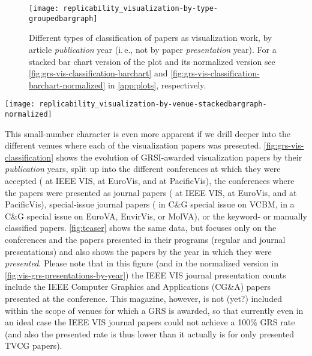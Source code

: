 \documentclass[conference,svgnames]{vgtc}                     %
\newcommand{\ie}{i.\,e.}
\begin{document}
\begin{figure}
	\centering
	\texttt{[image: replicability\_visualization-by-type-groupedbargraph]}
	\caption{Different types of classification of papers as visualization work, by article \emph{publication} year (\ie, not by paper \emph{presentation} year). For a stacked bar chart version of the plot and its normalized version see \autoref{fig:grs-vis-classification-barchart} and \autoref{fig:grs-vis-classification-barchart-normalized} in \autoref{app:plots}, respectively.}
	\label{fig:grs-vis-classification}
\end{figure}

\begin{figure*}
	\centering
	\texttt{[image: replicability\_visualization-by-venue-stackedbargraph-normalized]}
	\caption{Papers that can clearly be classified as visualization work (based on being accepted to visualization conferences, being journal presentations at visualization conferences,\textsuperscript{\ref{foot:vis_presentations},\ref{foot:c-and-g-special}} or having appeared in visualization-themed special issues in journals) by \emph{presentation} year (\ie, based on the \emph{conference years}, in which the papers were presented; same data as in \autoref{fig:teaser}), with their GRS proportions, normalized.}
	\label{fig:vis-grs-presentations-by-year}
\end{figure*}

This small-number character is even more apparent if we drill deeper into the different venues where each of the visualization papers was presented. \autoref{fig:grs-vis-classification} shows the evolution of GRSI-awarded visualization papers by their \emph{publication} years, split up into the different conferences at which they were accepted (\GrsiIeeeVisPapersCount{} at IEEE VIS, \GrsiEuroVisPapersCount{} at EuroVis, and \GrsiPacificVisTvcgPapersCount{} at PacificVis), the conferences where the papers were presented as journal papers (\GrsiIeeeVisJournalPresentationsCount{} at IEEE VIS, \GrsiEuroVisJournalPresentationsCount{} at EuroVis, and \GrsiPacificVisJournalPresentationsCount{} at PacificVis), special-issue journal papers (\GrsiVcbmCagPapersCount{} in C\&G special issue on VCBM, \GrsiCagSpecialIssuesPapersCount{} in a C\&G special issue on EuroVA, EnvirVis, or MolVA), or the \GrsiVisKeywordPlusManualPapersCount{} keyword- or manually classified papers. \autoref{fig:teaser} shows the same data, but focuses only on the conferences and the papers presented in their programs (regular and journal presentations) and also shows the papers by the year in which they were \emph{presented}. Please note that in this figure (and in the normalized version in \autoref{fig:vis-grs-presentations-by-year}) the IEEE VIS journal presentation counts include the IEEE Computer Graphics and Applications (CG\&A) papers presented at the conference. This magazine, however, is not (yet?) included within the scope of venues for which a GRS is awarded, so that currently even in an ideal case the IEEE VIS journal papers could not achieve a 100\% GRS rate (and also the presented rate is thus lower than it actually is for only presented TVCG papers).
\end{document}
